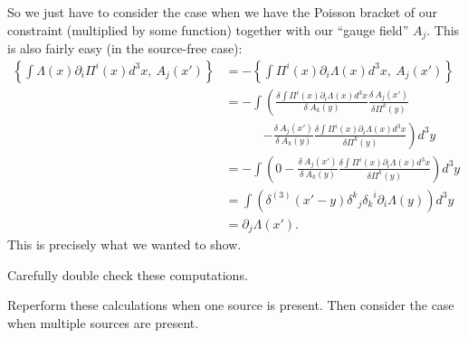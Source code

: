 So we just have to consider the case when we have the Poisson
bracket of our constraint (multiplied by some function) together
with our ``gauge field'' $A_{j}$. This is also fairly easy (in
the source-free case):
\begin{subequations}
\begin{align}
\left\{\int \Lambda(x)\partial_{i}\Pi^{i}(x)d^{3}x,~ A_{j}(x')\right\}
&=-\left\{\int \Pi^{i}(x)\partial_{i}\Lambda(x)d^{3}x,~ A_{j}(x')\right\}
\\
&= -\int\left(\frac{\delta\int
  \Pi^{i}(x)\partial_{i}\Lambda(x)d^{3}x}{\delta~A_{k}(y)}\frac{\delta~A_{j}(x')}{\delta\Pi^{k}(y)}\right.\\\nonumber
&\phantom{-\int\left(\frac{}{}\right.~}\left.-\frac{\delta~A_{j}(x')}{\delta~A_{k}(y)}\frac{\delta\int \Pi^{i}(x)\partial_{i}\Lambda(x)d^{3}x}{\delta\Pi^{k}(y)} \right)d^{3}y\\
&=-\int\left(0-\frac{\delta~A_{j}(x')}{\delta~A_{k}(y)}\frac{\delta\int \Pi^{i}(x)\partial_{i}\Lambda(x)d^{3}x}{\delta\Pi^{k}(y)} \right)d^{3}y\\
&=\int\left(\delta^{(3)}(x'-y){\delta^{k}}_{j}{\delta_{k}}^{i}\partial_{i}\Lambda(y)\right)d^{3}y\\
&=\partial_{j}\Lambda(x').
\end{align}
\end{subequations}
This is precisely what we wanted to show.

\begin{exercise}
Carefully double check these computations.
\end{exercise}
\begin{exercise}
Reperform these calculations when one source is present. Then
consider the case when multiple sources are present.
\end{exercise}

